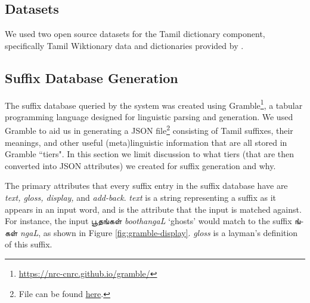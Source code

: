 \documentclass[11pt]{article}
\begin{document}
\subsection{Datasets}
We used two open source datasets for the Tamil dictionary component, specifically 
Tamil Wiktionary data \citet{ylonen_wiktextract_2022} and dictionaries provided by \citet{vasuki_dharma_nodate}.

\subsection{Suffix Database Generation} \label{sec:suffix-db-gen}
The suffix database queried by the system was created using Gramble\footnote{\href{https://nrc-cnrc.github.io/gramble/}{https://nrc-cnrc.github.io/gramble/}}, a tabular programming language designed for linguistic parsing and generation. 
We used Gramble to aid us in generating a JSON file\footnote{File can be found \href{https://github.com/saltyseadawg/kelvi-backend/blob/main/app/morphology/glosser/gramble_tamil_output.json}{here}.} consisting of Tamil suffixes, their meanings, and other useful (meta)linguistic information that are all stored in Gramble “tiers".
In this section we limit discussion to what tiers (that are then converted into JSON attributes) 
we created for suffix generation and why.

The primary attributes that every suffix entry in the suffix database have are 
\textit{text, gloss, display,} and \textit{add-back}. \textit{text} is a string representing a suffix 
as it appears in an input word, and is the attribute that the input is 
matched against. 
For instance, the input \foreignlanguage{tamil}{பூதங்கள்} \textit{boothangaL} ‘ghosts’ would match to the 
suffix \foreignlanguage{tamil}{ங்கள்} \textit{ngaL}, as shown in Figure \ref{fig:gramble-display}. \textit{gloss} is a layman's definition of this suffix.
\end{document}

